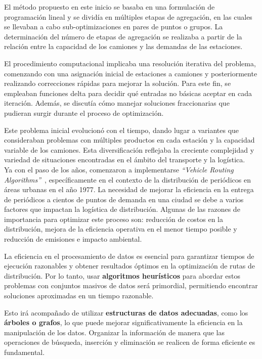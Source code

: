 \documentclass[letter, 10pt]{article}
\begin{document}
El método propuesto en este inicio se basaba en una formulación de programación lineal y se dividía en múltiples etapas de agregación, en las cuales se llevaban a cabo sub-optimizaciones en pares de puntos o grupos. La determinación del número de etapas de agregación se realizaba a partir de la relación entre la capacidad de los camiones y las demandas de las estaciones.

El procedimiento computacional implicaba una resolución iterativa del problema, comenzando con una asignación inicial de estaciones a camiones y posteriormente realizando correcciones rápidas para mejorar la solución. Para este fin, se empleaban funciones delta para decidir qué entradas no básicas aceptar en cada iteración. Además, se discutía cómo manejar soluciones fraccionarias que pudieran surgir durante el proceso de optimización.

Este problema inicial evolucionó con el tiempo, dando lugar a variantes que consideraban problemas con múltiples productos en cada estación y la capacidad variable de los camiones. Esta diversificación reflejaba la creciente complejidad y variedad de situaciones encontradas en el ámbito del transporte y la logística.
\\

Ya con el paso de los años, comenzaron a implementarse \textit{``Vehicle Routing Algorithms''}~\cite{ImplementingVRAlgorithms}, específicamente en el contexto de la distribución de periódicos en áreas urbanas en el año 1977. La necesidad de mejorar la eficiencia en la entrega de periódicos a cientos de puntos de demanda en una ciudad se debe a varios factores que impactan la logística de distribución. Algunas de las razones de importancia para optimizar este proceso son: reducción de costos en la distribución, mejora de la eficiencia operativa en el menor tiempo posible y reducción de emisiones e impacto ambiental.

La eficiencia en el procesamiento de datos es esencial para garantizar tiempos de ejecución razonables y obtener resultados óptimos en la optimización de rutas de distribución. Por lo tanto, usar \textbf{algoritmos heurísticos} para abordar estos problemas con conjuntos masivos de datos será primordial, permitiendo encontrar soluciones aproximadas en un tiempo razonable.

Esto irá acompañado de utilizar \textbf{estructuras de datos adecuadas}, como los \textbf{árboles o grafos}, lo que puede mejorar significativamente la eficiencia en la manipulación de los datos. Organizar la información de manera que las operaciones de búsqueda, inserción y eliminación se realicen de forma eficiente es fundamental.
\end{document}
